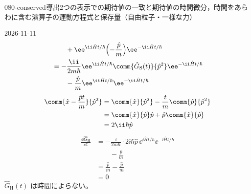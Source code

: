 \documentclass[uplatex,dvipdfmx,a4paper,11pt]{jsarticle}
\begin{document}
\begin{mondai}{080-conserved}{導出}{2つの表示での期待値の一致と期待値の時間微分，時間をあらわに含む演算子の運動方程式と保存量（自由粒子・一様な力）}
\begin{kotaeutsushi}{2026-11-11}
\begin{align*}
&\qquad+\ee^{\ii\hat{H}t/\hbar}\Bigl(-\frac{\hat{p}}{m}\Bigr)\ee^{-\ii\hat{H}t/\hbar}\\
&=-\frac{\ii}{2m\hbar}\ee^{\ii\hat{H}t/\hbar}\comm{\hat{G}_{\mathrm{S}}(t)}{\hat{p}^{2}}\ee^{-\ii\hat{H}t/\hbar}\\
&\qquad-\frac{\hat{p}}{m}\ee^{\ii\hat{H}t/\hbar}\ee^{-\ii\hat{H}t/\hbar}
\end{align*}
\begin{align*}
\comm{\hat{x}-\frac{\hat{p}t}{m}}{\hat{p}^{2}}&=\comm{\hat{x}}{\hat{p}^{2}}-\frac{t}{m}\comm{\hat{p}}{\hat{p}^{2}}\\
&=\comm{\hat{x}}{\hat{p}}\hat{p}+\hat{p}\comm{\hat{x}}{\hat{p}}\\
&=2\ii\hbar\hat{p}
\end{align*}
\begin{align*}
\frac{\dd\hat{G}_{\mathrm{H}}}{\dd t}&=-\frac{\ii}{2m\hbar}\cdot2\ii\hbar\hat{p}\,\ee^{\ii\hat{H}t/\hbar}\ee^{-\ii\hat{H}t/\hbar}\\
&\qquad-\frac{\hat{p}}{m}\\
&=\frac{\hat{p}}{m}-\frac{\hat{p}}{m}\\
&=0
\end{align*}
$\hat{G}_{\mathrm{H}}(t)$ は時間によらない。


\end{kotaeutsushi}
\end{mondai}
\end{document}
